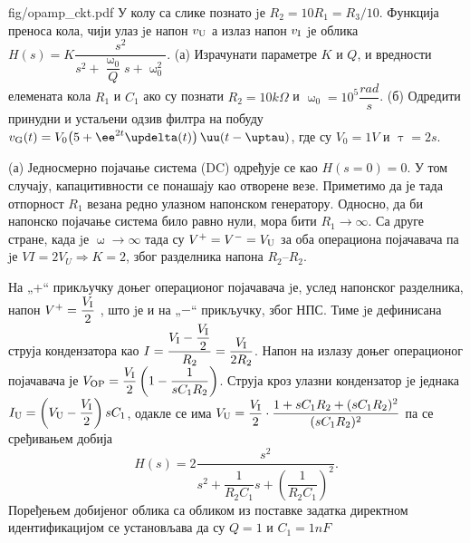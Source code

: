 \mnDifficult
\begin{slikaDesno}{fig/opamp_ckt.pdf}
    \PID
    У колу са слике познато jе 
    $R_2 = 10 R_1 = R_3/10$. Функција преноса
    кола, чији улаз jе напон $v_{\rm U}$ а излаз напон 
    $v_{\rm I}$ jе облика
    $
    {H(s) = K\dfrac{s^2}{s^2 + \dfrac{\upomega_0}{Q} s + \upomega_0^2 }}
    $.
    (а) Израчунати параметре $K$ и $Q$,
    и вредности елемената кола $R_1$ и $C_1$ ако су познати $R_2 = 10\unit{k\Omega}$ и 
    $\upomega_0 = 10^5\unit{\dfrac{rad}{s}}$.
    (б) Одредити принудни и устаљени одзив филтра на побуду
    $v_{\rm G}(t) = V_0 \bigl(5 + \ee^{2t} \updelta(t) \bigr)\,\uu(t - \uptau)$, где су $V_0 = 1\unit{V}$ 
    и $\uptau = 2\unit{s}$. 
\end{slikaDesno}

\RESENJE

(а) 
Једносмерно појачање система (DC) одређује се као
$H(s = 0) = 0$. У том случају, капацитивности се понашају као отворене везе. 
Приметимо да је тада отпорност $R_1$ везана редно улазном напонском генератору. 
Односно, да би напонско појачање система било равно нули, мора бити 
$R_1 \to \infty$. 
Са друге стране, 
када jе $\upomega \to \infty$ тада су 
$V^+ = V^- = V_{\rm U}$ за оба операциона појачавача па jе
$VI = 2V_U \Rightarrow K = 2$, због разделника напона $R_2$--$R_2$.

На „+“ прикључку доњег операционог појачавача jе, услед напонског разделника, 
напон $V^+ = \dfrac{V_{\rm I}}2$ , што jе и на „$-$“ прикључку, због НПС.
Тиме jе дефинисана струја кондензатора
као $I = \dfrac{V_{\rm I} - \dfrac{V_{\rm I}}{2}}{R_2} = \dfrac{V_{\rm I}}{2R_2}$.
Напон на излазу доњег операционог појачавача је 
$V_{\rm OP} = \dfrac{V_{\rm I}}{2} \left( 1 - \dfrac{1}{sC_1R_2} \right)$.
Струја
кроз улазни кондензатор jе једнака 
$I_{\rm U}
=
\left(
    V_{\rm U} 
    -
    \dfrac{V_{\rm I}}{2}
\right) sC_1$, одакле се има 
$V_{\rm U} = \dfrac{V_{\rm I}}{2}
\cdot
\dfrac{1 + sC_1R_2 + (sC_1R_2)^2 }{ (sC_1R_2)^2 }$
па се сређивањем добија
\begin{equation}
    H(s) = 2 \dfrac{s^2}{ 
        s^2 + \dfrac{1}{R_2 C_1} s + \left( \dfrac{1}{R_2 C_1} \right)^2
    }.
\end{equation}
Поређењем добијеног облика са обликом из поставке задатка директном идентификацијом 
се установљава да су $Q = 1$ и $C_1 = 1\unit{nF}$

